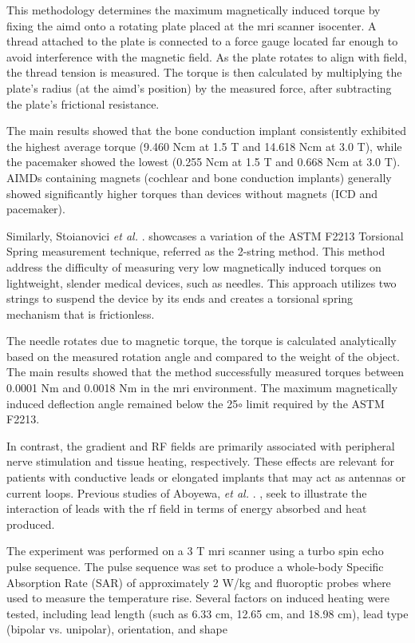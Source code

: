 This methodology determines the maximum magnetically induced torque by fixing the \gls{aimd} onto a rotating plate placed at the \gls{mri} scanner isocenter. A thread attached to the plate is connected to a force gauge located far enough to avoid interference with the magnetic field. As the plate rotates to align with 
field, the thread tension is measured. The torque is then calculated by multiplying the plate’s radius (at the \gls{aimd}’s position) by the measured force, after subtracting the plate’s frictional resistance.

The main results showed that the bone conduction implant consistently exhibited the highest average torque (9.460 Ncm at 1.5 T and 14.618 Ncm at 3.0 T), while the pacemaker showed the lowest (0.255 Ncm at 1.5 T and 0.668 Ncm at 3.0 T). AIMDs containing magnets (cochlear and bone conduction implants) generally showed significantly higher torques than devices without magnets (ICD and pacemaker).

Similarly, Stoianovici \textit{et al.} . \cite{stoianovici2024} showcases a variation of the ASTM F2213 Torsional Spring measurement technique, referred as the 2-string method. This method address the difficulty of measuring very low magnetically induced torques on lightweight, slender medical devices, such as needles. This approach utilizes two strings to suspend the device by its ends and creates a torsional spring mechanism that is frictionless.

The needle rotates due to magnetic torque, the torque is calculated analytically based on the measured rotation angle and compared to the weight of the object. The main results showed that the method successfully measured torques between 0.0001 Nm and 0.0018 Nm in the \gls{mri} environment. The maximum magnetically induced deflection angle remained below the 25$\circ$ limit required by the ASTM F2213.

In contrast, the gradient and RF fields are primarily associated with peripheral nerve stimulation and tissue heating, respectively. These effects are relevant for patients with conductive leads or elongated implants that may act as antennas or current loops. Previous studies of Aboyewa, \textit{et al.} . \cite{aboyewa2021}, seek to illustrate the interaction of leads with the \gls{rf} field in terms of energy absorbed and heat produced.  

The experiment was performed on a 3 T \gls{mri} scanner using a turbo spin echo pulse sequence. The pulse sequence was set to produce a whole-body Specific Absorption Rate (SAR) of approximately 2 W/kg and fluoroptic probes where used to measure the temperature rise. Several factors on induced heating were tested, including lead length (such as 6.33 cm, 12.65 cm, and 18.98 cm), lead type (bipolar vs. unipolar), orientation, and shape

